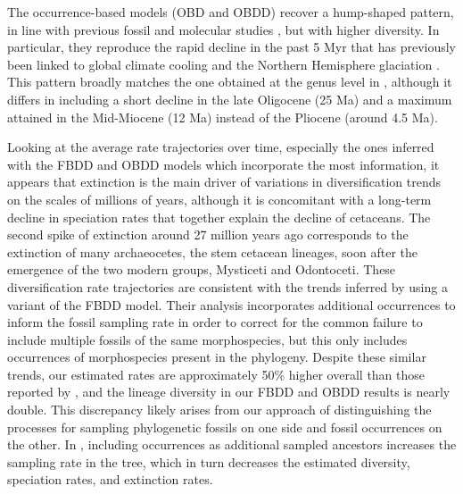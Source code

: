 \documentclass[oupdraft]{sysbio}
\begin{document}
The occurrence-based models (OBD and OBDD) recover a hump-shaped pattern, in line with previous fossil and molecular studies \citep{morlon_reconciling_2011}, but with higher diversity. In particular, they reproduce the rapid decline in the past 5 Myr that has previously been linked to global climate cooling and the Northern Hemisphere glaciation \citep{andreoletti_occurrence_2022}. This pattern broadly matches the one obtained at the genus level in \citet{andreoletti_occurrence_2022}, although it differs in including a short decline in the late Oligocene (25 Ma) and a maximum attained in the Mid-Miocene (12 Ma) instead of the Pliocene (around 4.5 Ma).

Looking at the average rate trajectories over time, especially the ones inferred with the FBDD and OBDD models which incorporate the most information, it appears that extinction is the main driver of variations in diversification trends on the scales of millions of years, although it is concomitant with a long-term decline in speciation rates that together explain the decline of cetaceans. The second spike of extinction around 27 million years ago corresponds to the extinction of many archaeocetes, the stem cetacean lineages, soon after the emergence of the two modern groups, Mysticeti and Odontoceti. 
These diversification rate trajectories are consistent with the trends inferred by \citet{quintero_rise_2025} using a variant of the FBDD model. Their analysis incorporates additional occurrences to inform the fossil sampling rate in order to correct for the common failure to include multiple fossils of the same morphospecies, but this only includes occurrences of morphospecies present in the phylogeny. Despite these similar trends, our estimated rates are approximately 50\% higher overall than those reported by \citet{quintero_rise_2025}, and the lineage diversity in our FBDD and OBDD results is nearly double. This discrepancy likely arises from our approach of distinguishing the processes for sampling phylogenetic fossils on one side and fossil occurrences on the other. In \citet{quintero_rise_2025}, including occurrences as additional sampled ancestors increases the sampling rate in the tree, which in turn decreases the estimated diversity, speciation rates, and extinction rates.
\end{document}
